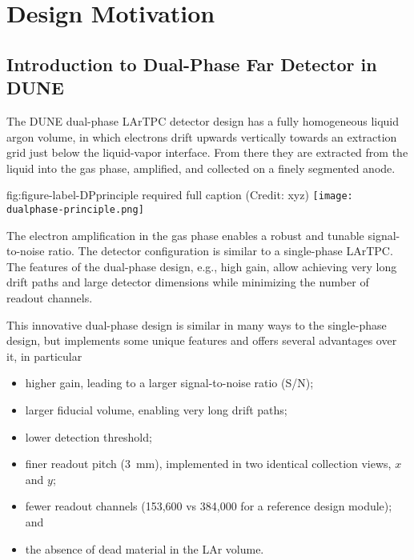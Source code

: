 \chapter{Design Motivation}
\label{ch:fddp-design}

\section{Introduction to Dual-Phase Far Detector in DUNE}
\label{sec:fddp-design-highlight}


The DUNE dual-phase LArTPC detector design 
has a fully homogeneous liquid argon volume, in which electrons
drift upwards vertically towards an extraction grid just below the liquid-vapor interface. From there they
are extracted from the liquid into the gas phase, amplified, and
collected on a finely segmented
anode.


\begin{dunefigure}{fig:figure-label-DPprinciple}
{required full caption (Credit: xyz)}
\texttt{[image: dualphase-principle.png]}
\end{dunefigure}

The electron amplification in the gas phase enables a robust and tunable signal-to-noise ratio. 
The detector configuration is similar to a single-phase LArTPC. The features of the dual-phase design, e.g., high gain, 
allow achieving very long drift paths and large detector dimensions while minimizing the number of readout channels.


This innovative dual-phase design is similar in many ways to the single-phase design,
but implements some unique features and offers several advantages over it, in particular
\begin{itemize}
\item  higher gain, leading to a larger signal-to-noise ratio (S/N);
\item  larger fiducial volume, enabling very long drift paths;
\item  lower detection threshold;
\item  finer readout pitch (3~mm), implemented in two identical collection views, $x$ and $y$;
\item  fewer readout channels (153,600 vs 384,000 for a reference design  module); and
\item  the absence of dead material in the LAr volume.
\end{itemize}

